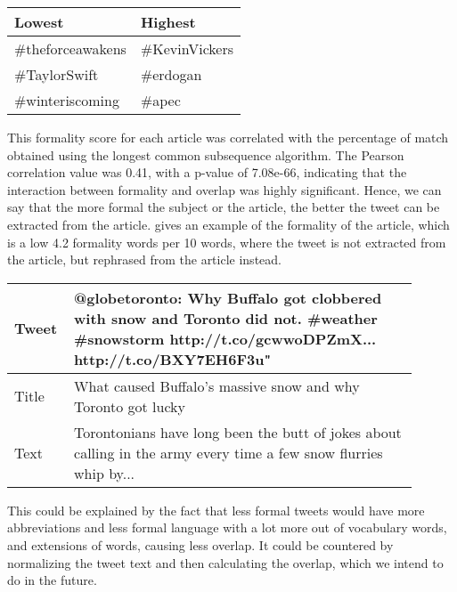 \begin{table}[htbp]
\centering
\begin{tabular}{|l|l|}
\hline
Lowest  & Highest  \\ \hline
\#theforceawakens       & \#KevinVickers           \\
\#TaylorSwift           & \#erdogan                \\
\#winteriscoming        & \#apec                  \\ \hline
\end{tabular}
\label{tab:formal}
\end{table}

This formality score for each article was correlated with the percentage of match obtained using the longest common subsequence algorithm. The Pearson correlation value was 0.41, with a p-value of 7.08e-66, indicating that the interaction between formality and overlap was highly significant. Hence, we can say that the more formal the subject or the article, the better the tweet can be extracted from the article.  gives an example of the formality of the article, which is a low 4.2 formality words per 10 words, where the tweet is not extracted from the article, but rephrased from the article instead.

\begin{table}[htbp]
\centering
\begin{tabular}{|p{0.1\linewidth}|p{0.8\linewidth}|}
\hline
Tweet &  @globetoronto: Why Buffalo got clobbered with snow and Toronto did not. \#weather \#snowstorm http://t.co/gcwwoDPZmX... http://t.co/BXY7EH6F3u" \\ \hline
Title & What caused Buffalo’s massive snow and why Toronto got lucky \\  \hline
Text  & Torontonians have long been the butt of jokes about calling in the army every time a few snow flurries whip by... \\ \hline
\end{tabular}
\label{tab:formal}
\end{table}

This could be explained by the fact that less formal tweets would have more abbreviations and less formal language with a lot more out of vocabulary words, and extensions of words, causing less overlap. It could be countered by normalizing the tweet text and then calculating the overlap, which we intend to do in the future.


